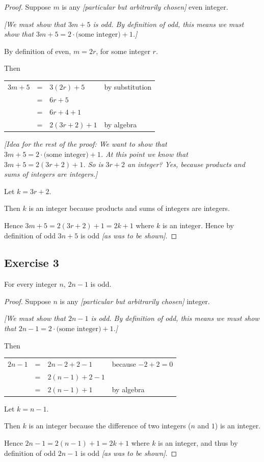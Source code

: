 \documentclass[14pt]{extarticle}
\newcommand{\cy}{\color{cyan}}
\begin{document}
\begin{proof}
Suppose $m$ is any {\it [particular but arbitrarily chosen]} even integer. 

{\it [We must show that $3m + 5$ is odd. By definition of odd, this means we must show that $3m + 5 = 2\cdot\text{(some integer)} + 1$.]}

By definition of even, $m = 2r$, for some integer $r$. 

Then

\begin{center}
\begin{tabular}{rcll}
$3m + 5$ & = & $3(2r) + 5$ & \cy by substitution \\
& = & $6r + 5$ & \\
& = & $6r + 4 + 1$ & \\
& = & $2(3r + 2) + 1$ & \cy by algebra \\
\end{tabular}
\end{center}

{\it [Idea for the rest of the proof: We want to show that $3m + 5 = 2\cdot\text{(some integer)} + 1$. At this point we know that $3m + 5 = 2(3r + 2) + 1$. So is $3r + 2$ an integer? Yes, because products and sums of integers are integers.]}

Let $k = 3r + 2$. 

Then $k$ is an integer because products and sums of integers are integers. 

Hence $3m + 5 = 2(3r+2) + 1 = 2k + 1$ where $k$ is an integer. Hence by definition of odd $3n+5$ is odd {\it [as was to be shown]}.
\end{proof}

\subsection{Exercise 3}
For every integer $n$, $2n - 1$ is odd.

\begin{proof}
Suppose $n$ is any {\it [particular but arbitrarily chosen]} integer. 

{\it [We must show that $2n - 1$ is odd. By definition of odd, this means we must show that $2n - 1 = 2 \cdot \text{(some integer)} + 1$.]}

Then

\begin{center}
\begin{tabular}{rcll}
$2n-1$ & = & $2n - 2 + 2 - 1$ & \cy because $-2 + 2 = 0$ \\
& = & $2(n-1) + 2 - 1$ & \\
& = & $2(n-1) + 1$ & \cy by algebra \\
\end{tabular}
\end{center}

Let $k = n-1$. 

Then $k$ is an integer because the difference of two integers ($n$ and $1$) is an integer. 

Hence $2n-1 = 2(n-1) + 1 = 2k + 1$ where $k$ is an integer, and thus by definition of odd $2n-1$ is odd {\it [as was to be shown]}.
\end{proof}
\end{document}
